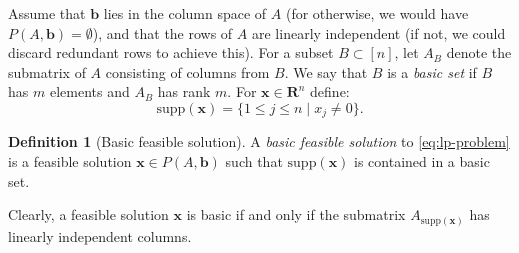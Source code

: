 \documentclass{amsbook}
\newcommand{\xx}{\mathbf x}
\newcommand{\bb}{\mathbf b}
\newcommand{\supp}{\mathrm{supp}}
\newcommand{\RR}{\mathbf R}
\theoremstyle{definition}
\newtheorem{definition}[theorem]{Definition}
\theoremstyle{remark}
\begin{document}
Assume that $\bb$ lies in the column space of $A$ (for otherwise, we would have $P(A,\bb)=\emptyset$), and that the rows of $A$ are linearly independent (if not, we could discard redundant rows to achieve this).
For a subset $B\subset [n]$, let $A_B$ denote the submatrix of $A$ consisting of columns from $B$.
We say that $B$ is a \emph{basic set} if $B$ has $m$ elements and $A_B$ has rank $m$.
For $\xx\in \RR^n$ define:
\begin{displaymath}
  \supp(\xx)=\{1\leq j\leq n\mid x_j\neq 0\}.
\end{displaymath}
\begin{definition}
  [Basic feasible solution]
  A \emph{basic feasible solution} to \eqref{eq:lp-problem} is a feasible solution $\xx\in P(A,\bb)$ such that $\supp(\xx)$ is contained in a basic set.
\end{definition}
Clearly, a feasible solution $\xx$ is basic if and only if the submatrix $A_{\supp(\xx)}$ has linearly independent columns.
\end{document}
